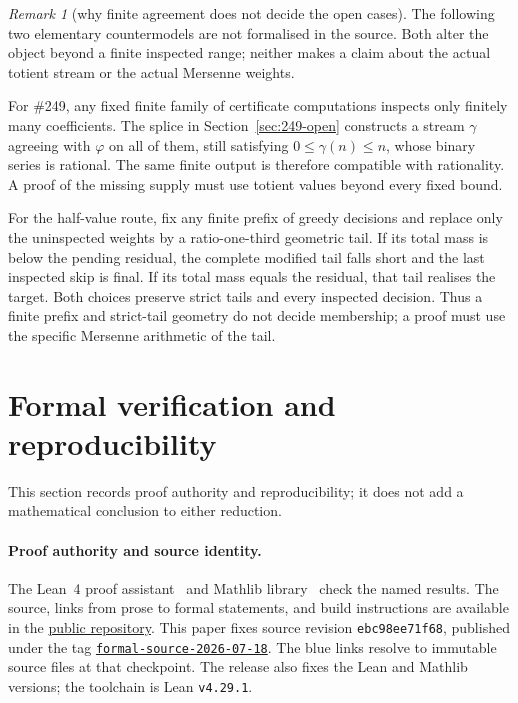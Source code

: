 \documentclass[11pt]{article}
\newcommand{\commitshort}{ebc98ee71f68}
\theoremstyle{definition}
\theoremstyle{remark}
\newtheorem*{remark}{Remark}
\newcommand{\ph}{\varphi}
\begin{document}
\begin{remark}[why finite agreement does not decide the open cases]
The following two elementary countermodels are not formalised in the source.
Both alter the object beyond a finite inspected range; neither makes a claim
about the actual totient stream or the actual Mersenne weights.

For \#249, any fixed finite family of certificate computations inspects only
finitely many coefficients.  The splice in Section~\ref{sec:249-open}
constructs a stream \(\gamma\) agreeing with \(\ph\) on all of them, still
satisfying \(0\leq\gamma(n)\leq n\), whose binary series is rational.  The
same finite output is therefore compatible with rationality.  A proof of the
missing supply must use totient values beyond every fixed bound.

For the half-value route, fix any finite prefix of greedy decisions and
replace only the uninspected weights by a ratio-one-third geometric tail.
If its total mass is below the pending residual, the complete modified tail
falls short and the last inspected skip is final.  If its total mass equals
the residual, that tail realises the target.  Both choices preserve strict
tails and every inspected decision.  Thus a finite prefix and strict-tail
geometry do not decide membership; a proof must use the specific Mersenne
arithmetic of the tail.
\end{remark}

\section{Formal verification and reproducibility}\label{sec:verify}

\noindent This section records proof authority and reproducibility; it does
not add a mathematical conclusion to either reduction.

\paragraph{Proof authority and source identity.}
The Lean~4 proof assistant~\cite{lean} and Mathlib library~\cite{mathlib} check
the named results.  The source, links from prose to formal statements, and build
instructions are available in the
\href{https://github.com/wcook04/plectis-lean-erdos249-257}{public repository}.
This paper fixes source revision \texttt{\commitshort}, published under
the tag
\href{https://github.com/wcook04/plectis-lean-erdos249-257/tree/formal-source-2026-07-18}{\texttt{formal-source-2026-07-18}}.
The blue links resolve to immutable source files at that checkpoint.
The release also fixes the Lean and Mathlib
versions; the toolchain is Lean \texttt{v4.29.1}.
\end{document}
